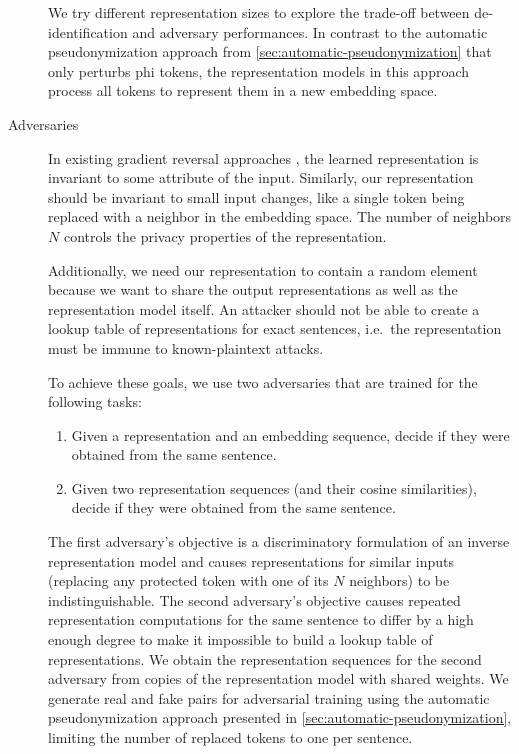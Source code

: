 \begin{description}
    We try different representation sizes to explore the trade-off between de-identification and adversary performances.
    In contrast to the automatic pseudonymization approach from \cref{sec:automatic-pseudonymization} that only perturbs \ac{phi} tokens, the representation models in this approach process all tokens to represent them in a new embedding space.
    
    \item[Adversaries]
    In existing gradient reversal approaches \citep{ganin2016domain,feutry2018learning,elazar2018adversarial}, the learned representation is invariant to some attribute of the input.
    Similarly, our representation should be invariant to small input changes, like a single token being replaced with a neighbor in the embedding space.
    The number of neighbors $N$ controls the privacy properties of the representation.
    
    Additionally, we need our representation to contain a random element because we want to share the output representations as well as the representation model itself.
    An attacker should not be able to create a lookup table of representations for exact sentences, i.e.\ the representation must be immune to known-plaintext attacks.
    
    To achieve these goals, we use two adversaries that are trained for the following tasks:
    \begin{enumerate}
        \item Given a representation and an embedding sequence, decide if they were obtained from the same sentence.
        \item Given two representation sequences (and their cosine similarities), decide if they were obtained from the same sentence.
    \end{enumerate}
    
    The first adversary's objective is a discriminatory formulation of an inverse representation model and causes representations for similar inputs (replacing any protected token with one of its $N$ neighbors) to be indistinguishable.
    The second adversary's objective causes repeated representation computations for the same sentence to differ by a high enough degree to make it impossible to build a lookup table of representations.
    We obtain the representation sequences for the second adversary from copies of the representation model with shared weights.
    We generate real and fake pairs for adversarial training using the automatic pseudonymization approach presented in \cref{sec:automatic-pseudonymization}, limiting the number of replaced tokens to one per sentence.
    

\end{description}
